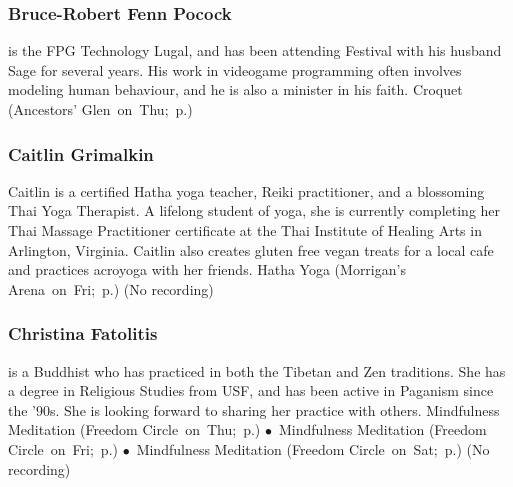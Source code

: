 \vspace{6pt}

\subsubsection{Bruce-Robert Fenn Pocock} %
{  \small  is the FPG Technology Lugal, and has been attending Festival with his husband Sage for several years. His work in videogame programming often involves modeling human behaviour, and he is also a minister in his faith. } %
\hspace{2em} {\footnotesize Croquet (Ancestors' Glen~on~Thu;~p.\pageref{Thu-Croquet})}

\vspace{6pt}

\subsubsection{Caitlin Grimalkin} %
{  \small  Caitlin is a certified Hatha yoga teacher, Reiki practitioner, and a blossoming Thai Yoga Therapist. A lifelong student of yoga, she is currently completing her Thai Massage Practitioner certificate at the Thai Institute of Healing Arts in Arlington, Virginia. Caitlin also creates gluten free vegan treats for a local cafe and practices acroyoga with her friends. } %
\hspace{2em} {\footnotesize Hatha Yoga (Morrigan's Arena~on~Fri;~p.\pageref{Fri-Caitlin1})}
 {\small (No recording)} 

\vspace{6pt}

\subsubsection{Christina Fatolitis} %
{  \small  is a Buddhist who has practiced in both the Tibetan and Zen traditions. She has a degree in Religious Studies from USF, and has been active in Paganism since the '90s. She is looking forward to sharing her practice with others.  } %
\hspace{2em} {\footnotesize Mindfulness Meditation (Freedom Circle~on~Thu;~p.\pageref{Thu-Fatolitis1}) $\bullet$~Mindfulness Meditation (Freedom Circle~on~Fri;~p.\pageref{Fri-Fatolitis2}) $\bullet$~Mindfulness Meditation (Freedom Circle~on~Sat;~p.\pageref{Sat-Fatolitis3})}
 {\small (No recording)} 

\vspace{6pt}


